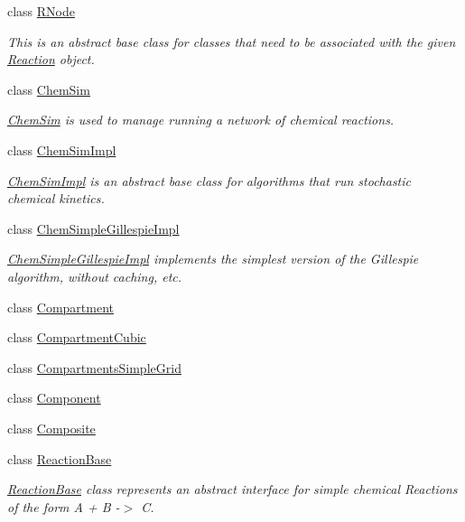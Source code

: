 \begin{DoxyCompactItemize}
class \hyperlink{classchem_1_1RNode}{R\-Node}
\begin{DoxyCompactList}\small\item\em This is an abstract base class for classes that need to be associated with the given \hyperlink{classchem_1_1Reaction}{Reaction} object. \end{DoxyCompactList}\item 
class \hyperlink{classchem_1_1ChemSim}{Chem\-Sim}
\begin{DoxyCompactList}\small\item\em \hyperlink{classchem_1_1ChemSim}{Chem\-Sim} is used to manage running a network of chemical reactions. \end{DoxyCompactList}\item 
class \hyperlink{classchem_1_1ChemSimImpl}{Chem\-Sim\-Impl}
\begin{DoxyCompactList}\small\item\em \hyperlink{classchem_1_1ChemSimImpl}{Chem\-Sim\-Impl} is an abstract base class for algorithms that run stochastic chemical kinetics. \end{DoxyCompactList}\item 
class \hyperlink{classchem_1_1ChemSimpleGillespieImpl}{Chem\-Simple\-Gillespie\-Impl}
\begin{DoxyCompactList}\small\item\em \hyperlink{classchem_1_1ChemSimpleGillespieImpl}{Chem\-Simple\-Gillespie\-Impl} implements the simplest version of the Gillespie algorithm, without caching, etc. \end{DoxyCompactList}\item 
class \hyperlink{classchem_1_1Compartment}{Compartment}
\item 
class \hyperlink{classchem_1_1CompartmentCubic}{Compartment\-Cubic}
\item 
class \hyperlink{classchem_1_1CompartmentsSimpleGrid}{Compartments\-Simple\-Grid}
\item 
class \hyperlink{classchem_1_1Component}{Component}
\item 
class \hyperlink{classchem_1_1Composite}{Composite}
\item 
class \hyperlink{classchem_1_1ReactionBase}{Reaction\-Base}
\begin{DoxyCompactList}\small\item\em \hyperlink{classchem_1_1ReactionBase}{Reaction\-Base} class represents an abstract interface for simple chemical Reactions of the form A + B -\/$>$ C. \end{DoxyCompactList}\item 

\end{DoxyCompactItemize}

